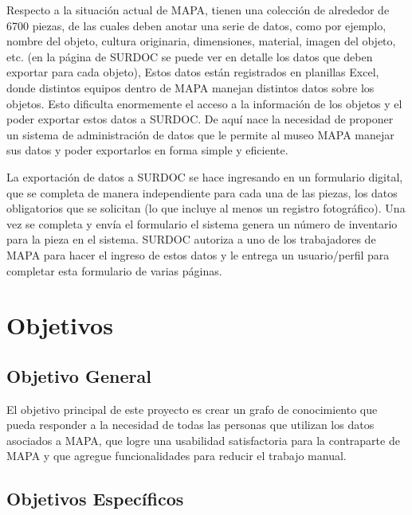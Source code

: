 Respecto a la situación actual de MAPA, tienen una colección de alrededor de 6700 piezas, de las cuales deben anotar una serie de datos, como por ejemplo, nombre del objeto, cultura originaria, dimensiones, material, imagen del objeto, etc. (en la página de SURDOC se puede ver en detalle los datos que deben exportar para cada objeto), Estos datos están registrados en planillas Excel, donde distintos equipos dentro de MAPA manejan distintos datos sobre los objetos. Esto dificulta enormemente el acceso a la información de los objetos y el poder exportar estos datos a SURDOC. De aquí nace la necesidad de proponer un sistema de administración de datos que le permite al museo MAPA manejar sus datos y poder exportarlos en forma simple y eficiente.

La exportación de datos a SURDOC se hace ingresando en un formulario digital, que se completa de manera independiente para cada una de las piezas, los datos obligatorios que se solicitan (lo que incluye al menos un registro fotográfico). Una vez se completa y envía el formulario el sistema genera un número de inventario para la pieza en el sistema. SURDOC autoriza a uno de los trabajadores de MAPA para hacer el ingreso de estos datos y le entrega un usuario/perfil para completar esta formulario de varias páginas.

\section{Objetivos}\label{chap:obj}

\subsection*{Objetivo General}\label{sec:obj-g}

El objetivo principal de este proyecto es crear un grafo de conocimiento que pueda responder a la necesidad de todas las personas que utilizan los datos asociados a MAPA, que logre una usabilidad satisfactoria para la contraparte de MAPA y que agregue funcionalidades para reducir el trabajo manual.

\subsection*{Objetivos Específicos}\label{sec:obj-e}


